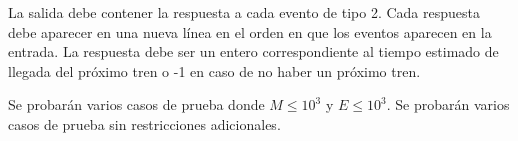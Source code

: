 \documentclass{oci}
\begin{document}
\begin{outputDescription}
  La salida debe contener la respuesta a cada evento de tipo 2.
  Cada respuesta debe aparecer en una nueva línea en el orden en
  que los eventos aparecen en la entrada.
  La respuesta debe ser un entero correspondiente al tiempo estimado de llegada
  del próximo tren o -1 en caso de no haber un próximo tren.
\end{outputDescription}

\begin{scoreDescription}
   Se probarán varios casos de prueba donde $M \leq 10^3$ y $E \leq 10^3$.
   Se probarán varios casos de prueba sin restricciones adicionales.
\end{scoreDescription}

\begin{sampleDescription}
\end{sampleDescription}
\end{document}
